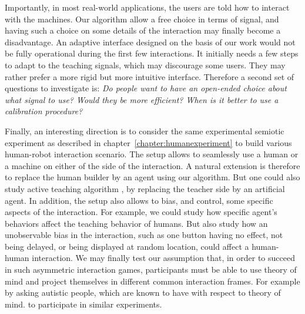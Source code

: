 
Importantly, in most real-world applications, the users are told how to interact with the machines. Our algorithm allow a free choice in terms of signal, and having such a choice on some details of the interaction may finally become a disadvantage. An adaptive interface designed on the basis of our work would not be fully operational during the first few interactions. It initially needs a few steps to adapt to the teaching signals, which may discourage some users. They may rather prefer a more rigid but more intuitive interface. Therefore a second set of questions to investigate is: \emph{Do people want to have an open-ended choice about what signal to use? Would they be more efficient? When is it better to use a calibration procedure?}

Finally, an interesting direction is to consider the same experimental semiotic experiment as described in chapter~\ref{chapter:humanexperiment} to build various human-robot interaction scenario. The setup allows to seamlessly use a human or a machine on either of the side of the interaction. A natural extension is therefore to replace the human builder by an agent using our algorithm. But one could also study active teaching algorithm \cite{cakmak2012algorithmic}, by replacing the teacher side by an artificial agent. In addition, the setup also allows to bias, and control, some specific aspects of the interaction. For example, we could study how specific agent's behaviors affect the teaching behavior of humans. But also study how an unobservable bias in the  interaction, such as one button having no effect, not being delayed, or being displayed at random location, could affect a human-human interaction. We may finally test our assumption that, in order to succeed in such asymmetric interaction games, participants must be able to use theory of mind and project themselves in different common interaction frames. For example by asking autistic people, which are known to have with respect to theory of mind. to participate in similar experiments.




